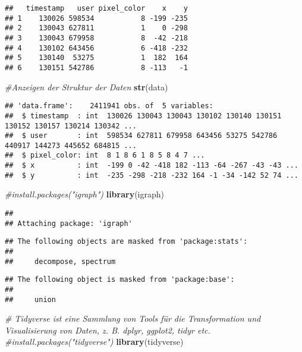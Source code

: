 \documentclass[
]{article}
\newenvironment{Shaded}{\begin{snugshade}}{\end{snugshade}}
\newcommand{\CommentTok}[1]{\textcolor[rgb]{0.56,0.35,0.01}{\textit{#1}}}
\newcommand{\FunctionTok}[1]{\textcolor[rgb]{0.13,0.29,0.53}{\textbf{#1}}}
\newcommand{\NormalTok}[1]{#1}
\begin{document}
\begin{verbatim}
##   timestamp   user pixel_color    x    y
## 1    130026 598534           8 -199 -235
## 2    130043 627811           1    0 -298
## 3    130043 679958           8  -42 -218
## 4    130102 643456           6 -418 -232
## 5    130140  53275           1  182  164
## 6    130151 542786           8 -113   -1
\end{verbatim}

\begin{Shaded}
\begin{Highlighting}[]
\CommentTok{\#Anzeigen der Struktur der Daten}
\FunctionTok{str}\NormalTok{(data)}
\end{Highlighting}
\end{Shaded}

\begin{verbatim}
## 'data.frame':    2411941 obs. of  5 variables:
##  $ timestamp  : int  130026 130043 130043 130102 130140 130151 130152 130157 130214 130342 ...
##  $ user       : int  598534 627811 679958 643456 53275 542786 440917 144273 445652 684815 ...
##  $ pixel_color: int  8 1 8 6 1 8 5 8 4 7 ...
##  $ x          : int  -199 0 -42 -418 182 -113 -64 -267 -43 -43 ...
##  $ y          : int  -235 -298 -218 -232 164 -1 -34 -142 52 74 ...
\end{verbatim}

\begin{Shaded}
\begin{Highlighting}[]
\CommentTok{\#install.packages("igraph")}
\FunctionTok{library}\NormalTok{(igraph)}
\end{Highlighting}
\end{Shaded}

\begin{verbatim}
## 
## Attaching package: 'igraph'
\end{verbatim}

\begin{verbatim}
## The following objects are masked from 'package:stats':
## 
##     decompose, spectrum
\end{verbatim}

\begin{verbatim}
## The following object is masked from 'package:base':
## 
##     union
\end{verbatim}

\begin{Shaded}
\begin{Highlighting}[]
\CommentTok{\# Tidyverse ist eine Sammlung von Tools für die Transformation und Visualisierung von Daten, z. B. dplyr, ggplot2, tidyr etc.}
\CommentTok{\#install.packages("tidyverse")}
\FunctionTok{library}\NormalTok{(tidyverse)}
\end{Highlighting}
\end{Shaded}
\end{document}
